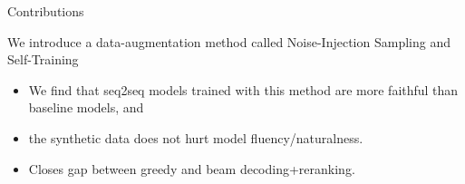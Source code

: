 
\begin{frame}{Contributions}

We introduce a data-augmentation method called
Noise-Injection Sampling and Self-Training 
\begin{itemize}
\item We find that seq2seq models trained with this method are more faithful
than baseline models, and
\vspace{10pt}
\item  the synthetic data does not  hurt model fluency/naturalness. 
\vspace{10pt}
\item  Closes gap between greedy and beam decoding+reranking.
\end{itemize}

\end{frame}
